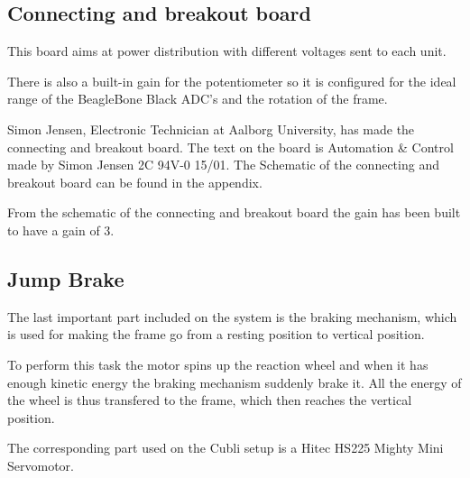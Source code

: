 \subsection{Connecting and breakout board}
This board aims at power distribution with different voltages sent to each unit.

There is also a built-in gain for the potentiometer so it is configured for the ideal range of the BeagleBone Black ADC's and the rotation of the frame. 

Simon Jensen, Electronic Technician at Aalborg University, has made the connecting and breakout board. The text on the board is Automation \& Control made by Simon Jensen 2C 94V-0 15/01. The Schematic of the connecting and breakout board can be found in the appendix.

From the schematic of the connecting and breakout board the gain has been built to have a gain of 3.


\subsection{Jump Brake}
The last important part included on the system is the braking mechanism, which is used for making the frame go from a resting position to vertical position. 

To perform this task the motor spins up the reaction wheel and when it has enough kinetic energy the braking mechanism suddenly brake it. All the energy of the wheel is thus transfered to the frame, which then reaches the vertical position.

The corresponding part used on the Cubli setup is a Hitec HS225 Mighty Mini Servomotor.

